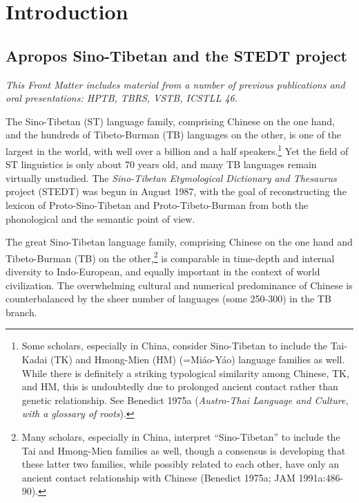 \vspace{0.25em}


\renewcommand{\thefootnote}{\arabic{footnote}}
\setcounter{footnote}{0}

\chapter*{Introduction}

\section{Apropos Sino-Tibetan and the STEDT project}

\textit{This Front Matter includes material from a number of previous publications and oral presentations: HPTB, TBRS, VSTB, ICSTLL 46.}

The Sino-Tibetan (ST) language family, comprising Chinese on the one hand,
and the hundreds of Tibeto-Burman (TB) languages on the other, is one of the
largest in the world, with well over a billion and a half
speakers.\footnote{Some scholars, especially in China,
consider Sino-Tibetan to include the
Tai-Kadai (TK) and Hmong-Mien (HM) (=Miáo-Yáo) language families as well.  While
there is definitely a striking typological similarity among Chinese, TK, and HM,
this is undoubtedly due to prolonged ancient contact rather than genetic
relationship.  See Benedict 1975a (\textit{Austro-Thai Language and Culture, with a
glossary of roots}).}  Yet the field of ST linguistics is only about 70 years
old, and many TB languages remain virtually unstudied.  The \textit{Sino-Tibetan
Etymological Dictionary and Thesaurus} project (STEDT) was begun in August 1987,
with the goal of reconstructing the lexicon of Proto-Sino-Tibetan and
Proto-Tibeto-Burman from both the phonological and the semantic point of view.

The great Sino-Tibetan language family, comprising Chinese on the one hand and Tibeto-Burman (TB) on the other,\footnote{Many scholars, especially in China, interpret ``Sino-Tibetan'' to include the Tai and Hmong-Mien families as well, though a consensus is developing that these latter two families, while possibly related to each other, have only an ancient contact relationship with Chinese (Benedict 1975a; JAM 1991a:486-90).} is comparable in time-depth and internal diversity to Indo-European, and equally important in the context of world civilization. The overwhelming cultural and numerical predominance of Chinese is counterbalanced by the sheer number of languages (some 250-300) in the TB branch.

